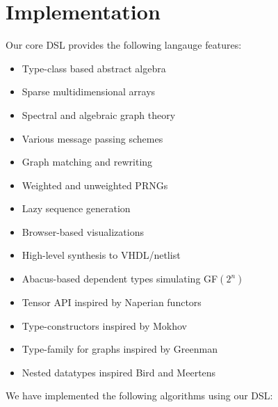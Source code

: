\documentclass[sigplan,10pt,review,anonymous]{acmart}
\begin{document}
%

\section{Implementation}

Our core DSL provides the following langauge features:

\begin{itemize}
  \item Type-class based abstract algebra
  \item Sparse multidimensional arrays
  \item Spectral and algebraic graph theory
  \item Various message passing schemes
  \item Graph matching and rewriting
  \item Weighted and unweighted PRNGs
  \item Lazy sequence generation
  \item Browser-based visualizations
  \item High-level synthesis to VHDL/netlist
  \item Abacus-based dependent types simulating GF$(2^n)$
  \item Tensor API inspired by Naperian functors~\citep{gibbons2017aplicative}
  \item Type-constructors inspired by Mokhov~\citep{mokhov2017algebraic}
  \item Type-family for graphs inspired by Greenman ~\citep{greenman2014getting}
  \item Nested datatypes inspired Bird and Meertens~\cite{bird1998nested}
\end{itemize}

We have implemented the following algorithms using our DSL:
\end{document}
